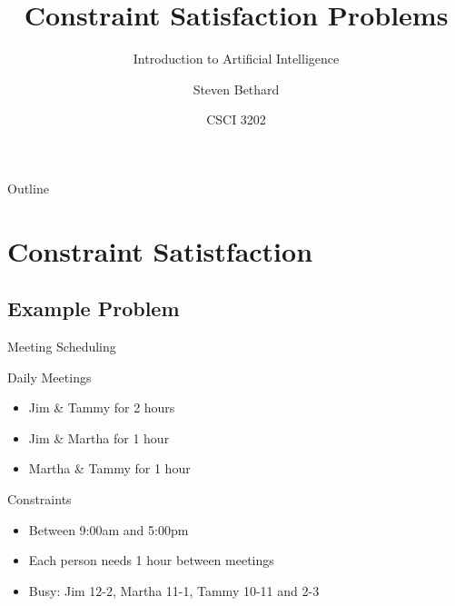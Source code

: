 \documentclass[12pt]{beamer}
\title{Constraint Satisfaction Problems}
\subtitle{Introduction to Artificial Intelligence}
\author{Steven Bethard}
\institute{
  Department of Computer Science\\
  University of Colorado
}
\date{CSCI 3202}
\begin{document}
\begin{frame}
  \titlepage
\end{frame}

\begin{frame}{Outline}
  \tableofcontents
\end{frame}

\section{Constraint Satistfaction}

\subsection{Example Problem}
\begin{frame}{Meeting Scheduling}
	\begin{block}{Daily Meetings}
		\begin{itemize}
			\item Jim \& Tammy for 2 hours
			\item Jim \& Martha for 1 hour
			\item Martha \& Tammy for 1 hour
		\end{itemize}
	\end{block}
	\begin{block}{Constraints}
		\begin{itemize}
			\item Between 9:00am and 5:00pm
			\item Each person needs 1 hour between meetings
			\item Busy: Jim 12-2, Martha 11-1, Tammy 10-11 and 2-3
		\end{itemize}
	\end{block}
\end{frame}
\end{document}
